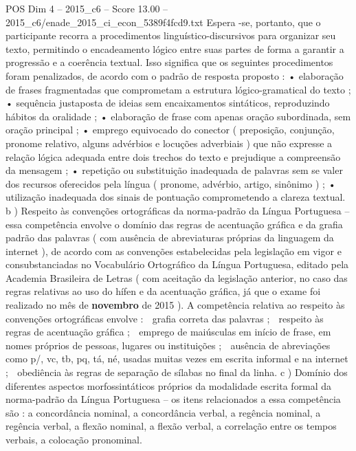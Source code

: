 \begin{textsample}{POS Dim 4 – 2015\_c6 – Score 13.00 – 2015\_c6/enade\_2015\_ci\_econ\_5389f4fcd9.txt}
Espera -se, portanto, que o participante recorra a procedimentos linguístico-discursivos para organizar seu texto, permitindo o encadeamento lógico entre suas partes de forma a garantir a progressão e a coerência textual.
Isso significa que os seguintes procedimentos foram penalizados, de acordo com o padrão de resposta proposto : • elaboração de frases fragmentadas que comprometam a estrutura lógico-gramatical do texto ; • sequência justaposta de ideias sem encaixamentos sintáticos, reproduzindo hábitos da oralidade ; • elaboração de frase com apenas oração subordinada, sem oração principal ; • emprego equivocado do conector ( preposição, conjunção, pronome relativo, alguns advérbios e locuções adverbiais ) que não expresse a relação lógica adequada entre dois trechos do texto e prejudique a compreensão da mensagem ; • repetição ou substituição inadequada de palavras sem se valer dos recursos oferecidos pela língua ( pronome, advérbio, artigo, sinônimo ) ; • utilização inadequada dos sinais de pontuação comprometendo a clareza textual. b ) Respeito às convenções ortográficas da norma-padrão da Língua Portuguesa – essa competência envolve o domínio das regras de acentuação gráfica e da grafia padrão das palavras ( com ausência de abreviaturas próprias da linguagem da internet ), de acordo com as convenções estabelecidas pela legislação em vigor e consubstanciadas no Vocabulário Ortográfico da Língua Portuguesa, editado pela Academia Brasileira de Letras ( com aceitação da legislação anterior, no caso das regras relativas ao uso do hífen e da acentuação gráfica, já que o exame foi realizado no mês de \textbf{novembro} de 2015 ).
A competência relativa ao respeito às convenções ortográficas envolve :  grafia correta das palavras ;  respeito às regras de acentuação gráfica ;  emprego de maiúsculas em início de frase, em nomes próprios de pessoas, lugares ou instituições ;  ausência de abreviações como p/, vc, tb, pq, tá, né, usadas muitas vezes em escrita informal e na internet ;  obediência às regras de separação de sílabas no final da linha. c ) Domínio dos diferentes aspectos morfossintáticos próprios da modalidade escrita formal da norma-padrão da Língua Portuguesa – os itens relacionados a essa competência são : a concordância nominal, a concordância verbal, a regência nominal, a regência verbal, a flexão nominal, a flexão verbal, a correlação entre os tempos verbais, a colocação pronominal.

\end{textsample}
